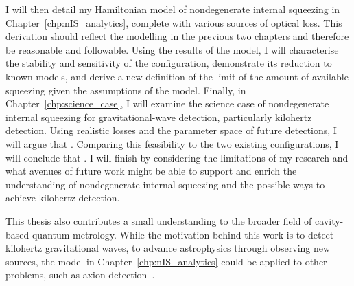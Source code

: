I will then detail my Hamiltonian model of nondegenerate internal squeezing in Chapter~\ref{chp:nIS_analytics}, complete with various sources of optical loss. This derivation should reflect the modelling in the previous two chapters and therefore be reasonable and followable. Using the results of the model, I will characterise the stability and sensitivity of the configuration, demonstrate its reduction to known models, and derive a new definition of the limit of the amount of available squeezing given the assumptions of the model. Finally, in Chapter~\ref{chp:science_case}, I will examine the science case of nondegenerate internal squeezing for gravitational-wave detection, particularly kilohertz detection. Using realistic losses and the parameter space of future detections, I will argue that . Comparing this feasibility to the two existing configurations, I will conclude that . I will finish by considering the limitations of my research and what avenues of future work might be able to support and enrich the understanding of nondegenerate internal squeezing and the possible ways to achieve kilohertz detection.

This thesis also contributes a small understanding to the broader field of cavity-based quantum metrology. While the motivation behind this work is to detect kilohertz gravitational waves, to advance astrophysics through observing new sources, the model in Chapter~\ref{chp:nIS_analytics} could be applied to other problems, such as axion detection~\cite{}.






